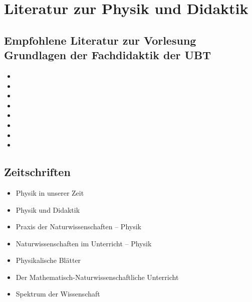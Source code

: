 \chapter{Literatur zur Physik und Didaktik}

\section{Empfohlene Literatur zur Vorlesung {\glqq}Grundlagen der Fachdidaktik{\grqq} der UBT}
\begin{itemize}
	\item {}
	\item {}
	\item {}
	\item {}
	\item {}
	\item {}
	\item {}
	\item {}
\end{itemize}


\section{Zeitschriften}
\begin{itemize}
	\item %
	Physik in unserer Zeit
	\item %
	Physik und Didaktik
	\item %
	Praxis der Naturwissenschaften -- Physik
	\item %
	Naturwissenschaften im Unterricht -- Physik
	\item %
	Physikalische Blätter
	\item %
	Der Mathematisch-Naturwissenschaftliche Unterricht
	\item %
	Spektrum der Wissenschaft
\end{itemize}

%



